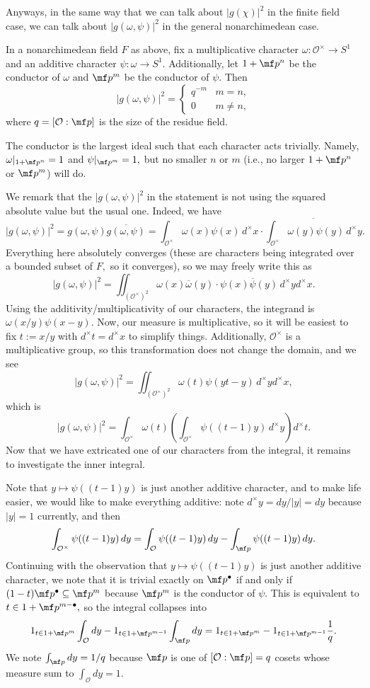 Anyways, in the same way that we can talk about $|g(\chi)|^2$ in the finite field case, we can talk about $|g(\omega,\psi)|^2$ in the general nonarchimedean case.
\begin{lemma}
    In a nonarchimedean field $F$ as above, fix a multiplicative character $\omega:\mathcal O^\times\to S^1$ and an additive character $\psi:\omega\to S^1.$ Additionally, let $1+\mf p^n$ be the conductor of $\omega$ and $\mf p^m$ be the conductor of $\psi.$ Then
    \[|g(\omega,\psi)|^2=\begin{cases}
        q^{-m} & m=n, \\
        0 & m\ne n,
    \end{cases}\]
    where $q=[\mathcal O:\mf p]$ is the size of the residue field.
\end{lemma}
The conductor is the largest ideal such that each character acts trivially. Namely, $\omega|_{1+\mf p^n}=1$ and $\psi|_{\mf p^m}=1,$ but no smaller $n$ or $m$ (i.e., no larger $1+\mf p^n$ or $\mf p^m$) will do.

We remark that the $|g(\omega,\psi)|^2$ in the statement is not using the squared absolute value but the usual one. Indeed, we have
\[|g(\omega,\psi)|^2=g(\omega,\psi)\overline{g(\omega,\psi)}=\int_{\mathcal O^\times}\omega(x)\psi(x)\,d^\times x\cdot\overline{\int_{\mathcal O^\times}\omega(y)\psi(y)\,d^\times y}.\]
Everything here absolutely converges (these are characters being integrated over a bounded subset of $F,$ so it converges), so we may freely write this as
\[|g(\omega,\psi)|^2=\iint_{\left(\mathcal O^\times\right)^2}\omega(x)\overline{\omega}(y)\cdot\psi(x)\overline\psi(y)\,d^\times yd^\times x.\]
Using the additivity/multiplicativity of our characters, the integrand is $\omega(x/y)\psi(x-y).$ Now, our measure is multiplicative, so it will be easiest to fix $t:=x/y$ with $d^\times t=d^\times x$ to simplify things. Additionally, $\mathcal O^\times$ is a multiplicative group, so this transformation does not change the domain, and we see
\[|g(\omega,\psi)|^2=\iint_{\left(\mathcal O^\times\right)^2}\omega(t)\psi(yt-y)\,d^\times yd^\times x,\]
which is
\[|g(\omega,\psi)|^2=\int_{\mathcal O^\times}\omega(t)\left(\int_{\mathcal O^\times}\psi((t-1)y)\,d^\times y\right)d^\times t.\]
Now that we have extricated one of our characters from the integral, it remains to investigate the inner integral.

Note that $y\mapsto\psi((t-1)y)$ is just another additive character, and to make life easier, we would like to make everything additive: note $d^\times y=dy/|y|=dy$ because $|y|=1$ currently, and then
\[\int_{\mathcal O^\times}\psi((t-1)y)\,dy=\int_{\mathcal O}\psi((t-1)y)\,dy-\int_{\mf p}\psi((t-1)y)\,dy.\]
Continuing with the observation that $y\mapsto\psi((t-1)y)$ is just another additive character, we note that it is trivial exactly on $\mf p^\bullet$ if and only if $(1-t)\mf p^\bullet\subseteq\mf p^m$ because $\mf p^m$ is the conductor of $\psi.$ This is equivalent to $t\in1+\mf p^{m-\bullet},$ so the integral collapses into
\[1_{t\in1+\mf p^m}\int_{\mathcal O}dy-1_{t\in1+\mf p^{m-1}}\int_{\mf p}dy=1_{t\in1+\mf p^m}-1_{t\in1+\mf p^{m-1}}\frac1q.\]
We note $\int_{\mf p}dy=1/q$ because $\mf p$ is one of $[\mathcal O:\mf p]=q$ cosets whose measure sum to $\int_{\mathcal O}dy=1.$

